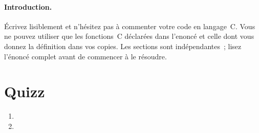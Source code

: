 \documentclass[ds]{sujet}
\begin{document}
\formation{} 
\matiere{}  
\auteur{} 
\def\SujetClsNumero{}
\paragraph{Introduction.}
\'Ecrivez lisiblement et n'h\'esitez pas \`a commenter votre code en
langage~C. 
Vous ne pouvez utiliser que les fonctions~C  d\'eclar\'ees
dans l'enonc\'e et celle dont vous donnez la d\'efinition dans vos copies.
Les sections sont ind\'ependantes~; lisez l'\'enonc\'e
complet avant de commencer \`a le r\'esoudre.
\section{Quizz}
\begin{enumerate}
\item
\item
\end{enumerate}


\end{document}

